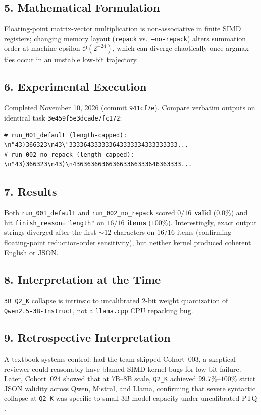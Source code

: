 \subsection*{5. Mathematical Formulation}
Floating-point matrix-vector multiplication is non-associative in finite SIMD registers; changing memory layout (\texttt{repack} vs.\ \texttt{--no-repack}) alters summation order at machine epsilon $\mathcal{O}(2^{-24})$, which can diverge chaotically once argmax ties occur in an unstable low-bit trajectory.

\subsection*{6. Experimental Execution}
Completed November 10, 2026 (commit \texttt{941cf7e}). Compare verbatim outputs on identical task \texttt{3e459f5e3dcade7fc172}:
\begin{lstlisting}
# run_001_default (length-capped):
\n"43)366323\n43\"333364333333643333334333333333...
# run_002_no_repack (length-capped):
\n"43)366323\n43)\n436363663663663366333646363333...
\end{lstlisting}

\subsection*{7. Results}
Both \texttt{run\_001\_default} and \texttt{run\_002\_no\_repack} scored \textbf{$0/16$ valid} ($0.0\%$) and hit \texttt{finish\_reason="length"} on \textbf{$16/16$ items} ($100\%$). Interestingly, exact output strings diverged after the first $\sim 12$ characters on $16/16$ items (confirming floating-point reduction-order sensitivity), but neither kernel produced coherent English or JSON.

\subsection*{8. Interpretation at the Time}
\texttt{3B Q2\_K} collapse is intrinsic to uncalibrated 2-bit weight quantization of \texttt{Qwen2.5-3B-Instruct}, not a \texttt{llama.cpp} CPU repacking bug.

\subsection*{9. Retrospective Interpretation}
A textbook systems control: had the team skipped Cohort~003, a skeptical reviewer could reasonably have blamed SIMD kernel bugs for low-bit failure. Later, Cohort~024 showed that at $7\text{B}$--$8\text{B}$ scale, \texttt{Q2\_K} achieved $99.7\%$--$100\%$ strict JSON validity across Qwen, Mistral, and Llama, confirming that severe syntactic collapse at \texttt{Q2\_K} was specific to small 3B model capacity under uncalibrated PTQ \citep{alimaskina2026extreme}.

